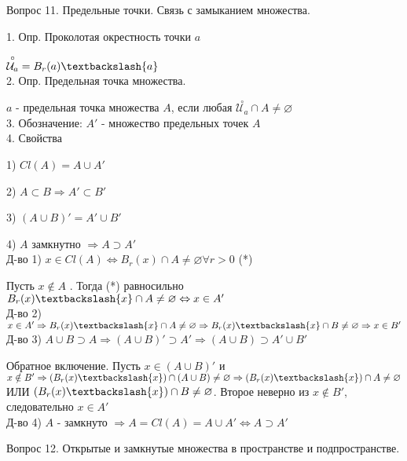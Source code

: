 \documentclass[12pt]{article}
\begin{document}
\begin{center}
Вопрос 11. Предельные точки. Связь с замыканием множества.
\end{center}

1. Опр. Проколотая окрестность точки $a$ 

$\overset{\circ}{\mathcal{U}_a} = B_r(a)\textbackslash \{a\}$\\

2. Опр. Предельная точка множества.

$a$ - предельная точка множества $A$, если любая $\overset{\circ}{\mathcal{U}_a}\cap A \neq \varnothing$\\

3. Обозначение: $A'$ - множество предельных точек $A$\\

4. Свойства

1) $Cl(A) = A\cup A'$

2) $A \subset B \Rightarrow A' \subset B'$

3) $(A\cup B)' = A' \cup B'$

4) $A$ замкнутно $\Rightarrow A\supset A'$\\

Д-во 1) $x \in Cl(A) \Leftrightarrow B_r(x)\cap A \neq \varnothing \forall r>0$ (*)

Пусть $x \notin A$ . Тогда (*) равносильно $B_r(x)\textbackslash \{x\} \cap A \neq \varnothing \Leftrightarrow x\in A'$\\

Д-во 2) $x \in A' \Rightarrow B_r(x)\textbackslash \{x\} \cap A  \neq \varnothing \Rightarrow B_r(x)\textbackslash \{x\} \cap B \neq \varnothing \Rightarrow x \in B'$\\

Д-во 3) $A \cup B \supset A \Rightarrow (A\cup B)' \supset A' \Rightarrow (A\cup B) \supset A'\cup B'$

Обратное включение. Пусть $x\in (A\cup B)'$ и $x \notin B' \Rightarrow (B_r(x)\textbackslash \{x\})\cap (A\cup B) \neq \varnothing \Rightarrow (B_r(x)\textbackslash \{x\})\cap A \neq \varnothing$ ИЛИ $(B_r(x)\textbackslash \{x\})\cap B \neq \varnothing$. Второе неверно из $x\notin B'$, следовательно $x \in A'$\\

Д-во 4) $A$ - замкнуто $\Rightarrow A = Cl(A) = A \cup A' \Leftrightarrow A \supset A'$
\newpage

\begin{center}
Вопрос 12. Открытые и замкнутые множества в пространстве и подпространстве.
\end{center}
\end{document}
